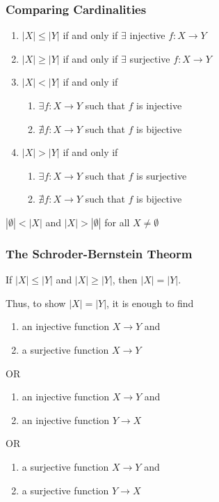 \subsubsection{Comparing Cardinalities}
\begin{enumerate}
    \item $|X| \leq |Y|$ if and only if $\exists$ injective $f:X\rightarrow Y$
    \item $|X| \geq |Y|$ if and only if $\exists$ surjective $f:X\rightarrow Y$
    \item $|X| < |Y|$ if and only if \begin{enumerate}
        \item $\exists f:X\rightarrow Y$ such that $f$ is injective
        \item $\nexists f:X\rightarrow Y$ such that $f$ is bijective
    \end{enumerate}
    \item $|X| > |Y|$ if and only if \begin{enumerate}
        \item $\exists f:X\rightarrow Y$ such that $f$ is surjective
        \item $\nexists f:X\rightarrow Y$ such that $f$ is bijective
    \end{enumerate}
\end{enumerate}

\begin{definition}
    $|\emptyset| < |X|$ and $|X| > |\emptyset|$ for all $X\neq \emptyset$
\end{definition}

\subsubsection{The Schroder-Bernstein Theorm}
If $|X| \leq |Y|$ and $|X| \geq |Y|$, then $|X| = |Y|$.

Thus, to show $|X| = |Y|$, it is enough to find
\begin{enumerate}
    \item an injective function $X\rightarrow Y$ and
    \item a surjective function $X\rightarrow Y$
\end{enumerate}
OR
\begin{enumerate}
    \item an injective function $X\rightarrow Y$ and
    \item an injective function $Y\rightarrow X$
\end{enumerate}
OR
\begin{enumerate}
    \item a surjective function $X\rightarrow Y$ and
    \item a surjective function $Y\rightarrow X$
\end{enumerate}

